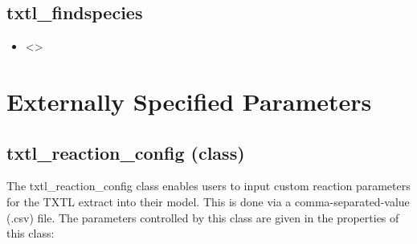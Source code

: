 \documentclass[english]{report}
\begin{document}
		\subsection*{txtl\_findspecies}
			\begin{itemize}
			\item <>
			\end{itemize}		
	\section{Externally Specified Parameters}
		\subsection*{txtl\_reaction\_config (class)}
		The txtl\_reaction\_config class enables users to input custom reaction parameters for the TXTL extract into their model. This is done via a comma-separated-value (.csv) file. The parameters controlled by this class are given in the properties of this class:
\end{document}
